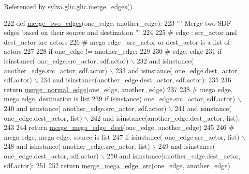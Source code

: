 Referenced by sylva.\+glic.\+glic.\+merge\+\_\+edges().


\begin{DoxyCode}
222     \textcolor{keyword}{def }\hyperlink{namespacesylva_1_1glic_1_1glic_a3230a4ec28a3787a073288b4532675cc}{merge\_two\_edges}(one\_edge, another\_edge):
223         \textcolor{stringliteral}{''' Merge two SDF edges based on their source and destination '''}
224 
225         \textcolor{comment}{# edge : src\_actor and dest\_actor are actors}
226         \textcolor{comment}{# mega edge : src\_actor or dest\_actor is a list of actors}
227 
228         \textcolor{keywordflow}{if} one\_edge != another\_edge:
229 
230             \textcolor{comment}{# edge, edge}
231             \textcolor{keywordflow}{if} isinstance( one\_edge.src\_actor, sdf.actor) \(\backslash\)
232                     \textcolor{keywordflow}{and} isinstance( another\_edge.src\_actor, sdf.actor) \(\backslash\)
233                     \textcolor{keywordflow}{and} isinstance( one\_edge.dest\_actor, sdf.actor) \(\backslash\)
234                     \textcolor{keywordflow}{and} isinstance(another\_edge.dest\_actor, sdf.actor):
235 
236                 \textcolor{keywordflow}{return} \hyperlink{namespacesylva_1_1glic_1_1glic_a1d03fa1322fc331579ff650ea5612ce8}{merge\_normal\_edge}(one\_edge, another\_edge)
237 
238             \textcolor{comment}{# mega edge, mega edge, destination is list}
239             \textcolor{keywordflow}{if} isinstance( one\_edge.src\_actor, sdf.actor) \(\backslash\)
240                     \textcolor{keywordflow}{and} isinstance( another\_edge.src\_actor, sdf.actor) \(\backslash\)
241                     \textcolor{keywordflow}{and} isinstance( one\_edge.dest\_actor, list) \(\backslash\)
242                     \textcolor{keywordflow}{and} isinstance(another\_edge.dest\_actor, list):
243 
244                 \textcolor{keywordflow}{return} \hyperlink{namespacesylva_1_1glic_1_1glic_a80e6906ee9b3a3c96085594f6dab2f84}{merge\_mega\_edge\_dest}(one\_edge, another\_edge)
245 
246             \textcolor{comment}{# mega edge, mega edge, source is list}
247             \textcolor{keywordflow}{if} isinstance( one\_edge.src\_actor, list) \(\backslash\)
248                     \textcolor{keywordflow}{and} isinstance( another\_edge.src\_actor, list) \(\backslash\)
249                     \textcolor{keywordflow}{and} isinstance( one\_edge.dest\_actor, sdf.actor) \(\backslash\)
250                     \textcolor{keywordflow}{and} isinstance(another\_edge.dest\_actor, sdf.actor):
251 
252                 \textcolor{keywordflow}{return} \hyperlink{namespacesylva_1_1glic_1_1glic_aa4a9eb6227bd109eec96e5c1ad6579c5}{merge\_mega\_edge\_src}(one\_edge, another\_edge)

\end{DoxyCode}
